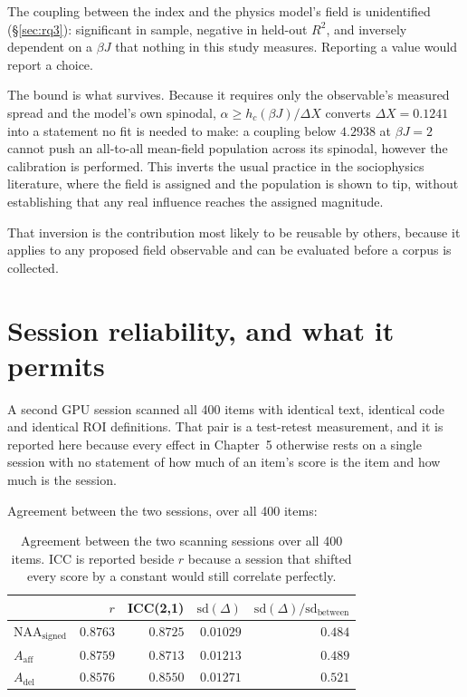 The coupling between the index and the physics model's field is unidentified
(\S\ref{sec:rq3}): significant in sample, negative in held-out $R^2$, and inversely dependent
on a $\beta J$ that nothing in this study measures. Reporting a value would report a choice.

The bound is what survives. Because it requires only the observable's measured spread and the
model's own spinodal, $\alpha \ge h_c(\beta J)/\Delta X$ converts $\Delta X = 0.1241$ into a
statement no fit is needed to make: a coupling below $4.2938$ at $\beta J = 2$ cannot push an
all-to-all mean-field population across its spinodal, however the calibration is performed. This inverts the usual
practice in the sociophysics literature, where the field is assigned and the population is
shown to tip, without establishing that any real influence reaches the assigned magnitude.

That inversion is the contribution most likely to be reusable by others, because it applies
to any proposed field observable and can be evaluated before a corpus is collected.

\section{Session reliability, and what it permits}
\label{sec:reliability}

A second GPU session scanned all 400 items with identical text, identical code and
identical ROI definitions. That pair is a test-retest measurement, and it is reported here
because every effect in Chapter~5 otherwise rests on a single session with no statement of
how much of an item's score is the item and how much is the session.

Agreement between the two sessions, over all 400 items:

\begin{table}[htbp]
\centering
\begin{tabular}{lrrrr}
\hline
& $r$ & ICC(2,1) & $\mathrm{sd}(\Delta)$ & $\mathrm{sd}(\Delta)/\mathrm{sd}_{\text{between}}$ \\
\hline
$\mathrm{NAA}_{\text{signed}}$ & $0.8763$ & $0.8725$ & $0.01029$ & $0.484$ \\
$A_{\text{aff}}$ & $0.8759$ & $0.8713$ & $0.01213$ & $0.489$ \\
$A_{\text{del}}$ & $0.8576$ & $0.8550$ & $0.01271$ & $0.521$ \\
\hline
\end{tabular}
\caption{Agreement between the two scanning sessions over all 400 items. ICC is reported beside $r$ because a session that shifted every score by a constant would still correlate perfectly.}
\label{tab:test-retest}
\end{table}

